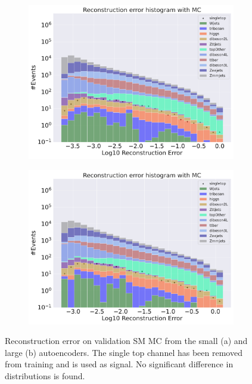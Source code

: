 \begin{figure}[H]
    \centering
    \begin{subfigure}{.45\textwidth}
        \includegraphics[width=\textwidth]{Figures/AE_testing/small/b_data_recon_big_rm3_feats_sig_singletop.pdf}
        \caption{}
        \label{fig:ae_small_singletop}
    \end{subfigure}
    \hfill
    \begin{subfigure}{.45\textwidth}
        \includegraphics[width=\textwidth]{Figures/AE_testing/big/b_data_recon_big_rm3_feats_sig_singletop.pdf}
        \caption{ }
        \label{fig:ae_big_singletop}
    \end{subfigure}
    \hfill
    \caption[AE | Reconstruction error using Singletop channel as signal]{Reconstruction error on validation SM MC from the small (a) and large (b) autoencoders. The single top channel has been removed from training and 
    is used as signal. No significant difference in distributions is found.  } 
    \label{fig:ae_big_channel_2}
\end{figure}

